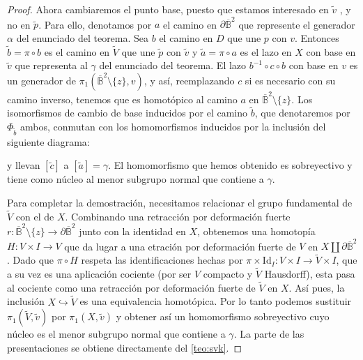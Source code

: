 \documentclass[10pt]{report}
\newcommand{\Disco}{\overline{\mathbb{B}}^2}
\theoremstyle{definition}
\begin{document}
\begin{proof}
Ahora cambiaremos el punto base, puesto que estamos interesado en $\tilde{v}$ , y no en $\tilde{p}$. Para ello, denotamos por $a$ el camino en $\partial \Disco $ que represente el generador $\alpha$ del enunciado del teorema. Sea $b$ el camino en $D$ que une $p$ con $v$. Entonces $\tilde{b} =\pi \circ b$ es el camino en $\tilde{V}$ que une $\tilde{p}$ con $\tilde{v}$ y $\tilde{a} = \pi \circ a$ es el lazo en $X$ con base en $\tilde{v}$ que representa al $\gamma$ del enunciado del teorema. El lazo $b^{-1} \circ c \circ b$ con base en $v$ es un generador de $\pi_1 (\Disco \setminus \{ z \} , v)$, y así, reemplazando $c$ si es necesario con su camino inverso, tenemos que es homotópico al camino $a$ en $\Disco \setminus \{ z \}$. Los isomorfismos de cambio de base inducidos por el camino $\tilde{b}$, que denotaremos por $\Phi_{\tilde{b}}$ ambos, conmutan con los homomorfismos inducidos por la inclusión del siguiente diagrama:
\begin{center}
\end{center}
y llevan $\left[ \tilde{c} \right]$ a $\left[ \tilde{a} \right] =\gamma$. El homomorfismo que hemos obtenido es sobreyectivo y tiene como núcleo al menor subgrupo normal que contiene a $\gamma$.

Para completar la demostración, necesitamos relacionar el grupo fundamental de $\tilde{V}$ con el de $X$. Combinando una retracción por deformación fuerte $r:\Disco \setminus \{ z \} \to \partial \Disco$ junto con la identidad en $X$, obtenemos una homotopía $H: V\times I \to V$ que da lugar a una etración por deformación fuerte de $V$ en $X \amalg \partial \Disco$. Dado que $\pi \circ H$ respeta las identificaciones hechas por $\pi \times \text{Id}_I : V \times I \to \tilde{V} \times I$, que a su vez es una aplicación cociente (por ser $V $ compacto y $\tilde{V}$ Hausdorff), esta pasa al cociente como una retracción por deformación fuerte de $\tilde{V}$ en $X$. Así pues, la inclusión $X \hookrightarrow \tilde{V}$ es una equivalencia homotópica. Por lo tanto podemos sustituir $\pi_1 (\tilde{V} , \tilde{v} )$ por $\pi_1 (X, \tilde{v} )$ y obtener así un homomorfismo sobreyectivo cuyo núcleo es el menor subgrupo normal que contiene a $\gamma$. La parte de las presentaciones se obtiene directamente del \autoref{teo:svk}. 



\end{proof}
\end{document}
